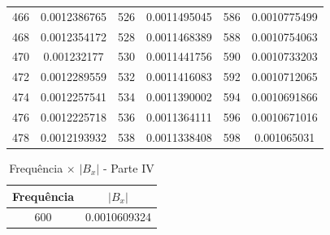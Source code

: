 \documentclass[
	12pt,				%
	openright,			%
	twoside,			%
	a4paper,			%
	english,			%
	french,				%
	spanish,			%
	brazil,				%
	]{abntex2}
\begin{document}
\begin{apendicesenv}
\begin{table}[H]
\begin{tabular}{c c| c c | c c}
466 & 0.0012386765 & 526 & 0.0011495045 & 586 & 0.0010775499\\
468 & 0.0012354172 & 528 & 0.0011468389 & 588 & 0.0010754063\\
470 & 0.001232177 & 530 & 0.0011441756 & 590 & 0.0010733203\\
472 & 0.0012289559 & 532 & 0.0011416083 & 592 & 0.0010712065\\
474 & 0.0012257541 & 534 & 0.0011390002 & 594 & 0.0010691866\\
476 & 0.0012225718 & 536 & 0.0011364111 & 596 & 0.0010671016\\
478 & 0.0012193932 & 538 & 0.0011338408 & 598 & 0.001065031\\

\end{tabular}
\end{table}

\newpage
\begin{table}[H]
\caption{Frequência  $\times$ $|B_{x}|$ - Parte IV}
\centering
\begin{tabular}{c c}
Frequência & $|B_{x}|$ \\
\hline
600 & 0.0010609324

\end{tabular}
\end{table}



\end{apendicesenv}
\end{document}
